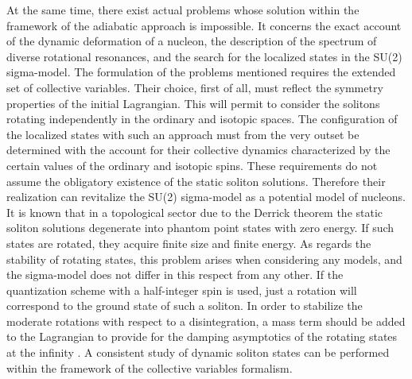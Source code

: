 \documentclass[a4paper,12pt]{article}
\begin{document}
At the same time, there exist actual problems whose solution within the
framework of the adiabatic approach is impossible. It concerns the exact
account of the dynamic deformation of a nucleon, the description of the
spectrum of diverse rotational resonances, and the search for the localized
states in the SU(2) sigma-model. The formulation of the problems mentioned
requires the extended set of collective variables. Their choice, first of all,
must reflect the symmetry properties of the initial Lagrangian. This will
permit to consider the solitons rotating independently in the ordinary and
isotopic spaces. The configuration of the localized states with such an
approach must from the very outset be determined with the account for their
collective dynamics characterized by the certain values of the ordinary and
isotopic spins. These requirements do not assume the obligatory existence of
the static soliton solutions. Therefore their realization can revitalize the
SU(2) sigma-model as a potential model of nucleons. It is known that in a
topological sector due to the Derrick theorem the static soliton solutions
degenerate into phantom point states with zero energy. If such states are
rotated, they acquire finite size and finite energy. As regards the stability
of rotating states, this problem arises when considering any models, and the
sigma-model does not differ in this respect from any other. If the
quantization scheme with a half-integer spin is used, just a rotation will
correspond to the ground state of such a soliton. In order to stabilize the
moderate rotations with respect to a disintegration, a mass term should be
added to the Lagrangian to provide for the damping asymptotics of the rotating
states at the infinity \cite{BR}. A consistent study of dynamic soliton
states can be performed within the framework of the collective variables
formalism.
\end{document}
